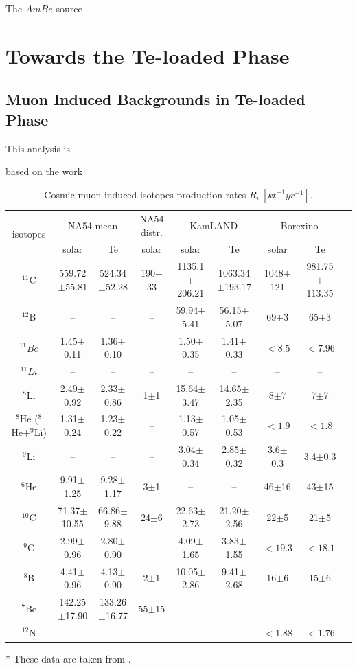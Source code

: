 The $AmBe$ source

\section{Towards the Te-loaded Phase}

\subsection{Muon Induced Backgrounds in Te-loaded Phase}
This analysis is 

based on the work



\begin{table}[ht]
	\caption{Cosmic muon induced isotopes production rates $R_i~[kt^{-1}yr^{−1}]$.}\label{estimateRates}
	\centering
	\scriptsize
	\begin{tabular*}{170mm}{c@{\extracolsep{\fill}}cccccccc}
		\toprule 
		\multirow{2}{*}{isotopes} &\multicolumn{2}{c}{NA54 mean}& NA54 distr.& \multicolumn{2}{c}{KamLAND}& \multicolumn{2}{c}{Borexino}\\
		\cline{2-3}   \cline{5-6} \cline{7-8}
		& solar & Te & solar  & solar & Te & solar & Te\\
		\midrule
		$^{11}$C &559.72$\pm$55.81 &524.34$\pm$52.28 &190$\pm$33 &1135.1$\pm$206.21 &1063.34$\pm$193.17& 1048$\pm$121 &981.75$\pm$113.35\\
		$^{12}$B & -- & -- & -- & 59.94$\pm$5.41& 56.15$\pm$5.07 &69$\pm$3 &65$\pm$3\\
		$^{11}Be$&  1.45$\pm$0.11& 1.36$\pm$0.10& -- &1.50$\pm$0.35 &1.41$\pm$0.33& $<8.5$ & $<7.96$ \\
                $^{11}Li$ & -- & -- & -- & -- & -- & -- & --\\
		$^8$Li & 2.49$\pm$0.92 & 2.33$\pm$0.86 & 1$\pm$1 & 15.64$\pm$3.47 & 14.65$\pm$2.35 & 8$\pm$7 & 7$\pm$7\\
		$^8$He ($^8$He+$^9$Li) & 1.31$\pm$0.24 & 1.23$\pm$0.22 & -- & 1.13$\pm$0.57 & 1.05$\pm$0.53 & $<1.9$ & $<1.8$\\
		$^9$Li & --&  --&  --&  3.04$\pm$0.34 & 2.85$\pm$0.32 & 3.6$\pm$0.3 & 3.4$\pm$0.3\\
        $^6$He & 9.91$\pm$1.25 & 9.28$\pm$1.17 & 3$\pm$1 &-- &-- &46$\pm$16 & 43$\pm$15\\
		$^{10}$C & 71.37$\pm$10.55 & 66.86$\pm$9.88 & 24$\pm$6 & 22.63$\pm$2.73 & 21.20$\pm$2.56 & 22$\pm$5 & 21$\pm$5\\
        $^9$C & 2.99$\pm$0.96 & 2.80$\pm$0.90 & -- & 4.09$\pm$1.65 & 3.83$\pm$1.55 & $<19.3$ & $<18.1$\\
        $^8$B & 4.41$\pm$0.96 & 4.13$\pm$0.90 & 2$\pm$1 & 10.05$\pm$2.86 & 9.41$\pm$2.68 & 16$\pm$6 & 15$\pm$6\\
		$^7$Be &142.25$\pm$17.90 & 133.26$\pm$16.77 & 55$\pm$15 & -- & -- & -- & --\\
		$^{12}$N & -- &--& --& --& --& $<1.88$ & $<1.76$\\
		\bottomrule
	\end{tabular*}
\end{table}
* These data are taken from \cite{nndc}.

